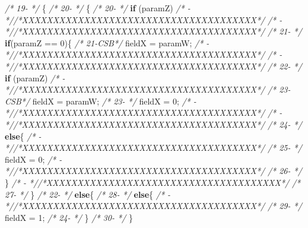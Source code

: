 \documentclass[
]{article}
\newenvironment{Shaded}{\begin{snugshade}}{\end{snugshade}}
\newcommand{\CommentTok}[1]{\textcolor[rgb]{0.56,0.35,0.01}{\textit{#1}}}
\newcommand{\DecValTok}[1]{\textcolor[rgb]{0.00,0.00,0.81}{#1}}
\newcommand{\KeywordTok}[1]{\textcolor[rgb]{0.13,0.29,0.53}{\textbf{#1}}}
\newcommand{\NormalTok}[1]{#1}
\begin{document}
\begin{landscape}
\begin{Shaded}
\begin{Highlighting}[]
\CommentTok{/* 19-   */}\NormalTok{    \{                                                    }\CommentTok{/* 20-   */}\NormalTok{    \{                                                    }
\CommentTok{/* 20-   */}        \KeywordTok{if}\NormalTok{ (paramZ)                                      }\CommentTok{/*   -   *//*XXXXXXXXXXXXXXXXXXXXXXXXXXXXXXXXXXXXXX*/}               
\CommentTok{/*   -   *//*XXXXXXXXXXXXXXXXXXXXXXXXXXXXXXXXXXXXXX*/}               \CommentTok{/* 21-   */}        \KeywordTok{if}\NormalTok{(paramZ == }\DecValTok{0}\NormalTok{)\{                                 }
\CommentTok{/* 21-CSB*/}\NormalTok{            fieldX = paramW;                             }\CommentTok{/*   -   *//*XXXXXXXXXXXXXXXXXXXXXXXXXXXXXXXXXXXXXX*/}               
\CommentTok{/*   -   *//*XXXXXXXXXXXXXXXXXXXXXXXXXXXXXXXXXXXXXX*/}               \CommentTok{/* 22-   */}            \KeywordTok{if}\NormalTok{ (paramZ)                                  }
\CommentTok{/*   -   *//*XXXXXXXXXXXXXXXXXXXXXXXXXXXXXXXXXXXXXX*/}               \CommentTok{/* 23-CSB*/}\NormalTok{                fieldX = paramW;                         }
\CommentTok{/* 23-   */}\NormalTok{            fieldX = }\DecValTok{0}\NormalTok{;                                  }\CommentTok{/*   -   *//*XXXXXXXXXXXXXXXXXXXXXXXXXXXXXXXXXXXXXX*/}               
\CommentTok{/*   -   *//*XXXXXXXXXXXXXXXXXXXXXXXXXXXXXXXXXXXXXX*/}               \CommentTok{/* 24-   */}            \KeywordTok{else}\NormalTok{\{                                        }
\CommentTok{/*   -   *//*XXXXXXXXXXXXXXXXXXXXXXXXXXXXXXXXXXXXXX*/}               \CommentTok{/* 25-   */}\NormalTok{                fieldX = }\DecValTok{0}\NormalTok{;                              }
\CommentTok{/*   -   *//*XXXXXXXXXXXXXXXXXXXXXXXXXXXXXXXXXXXXXX*/}               \CommentTok{/* 26-   */}\NormalTok{            \}                                            }
\CommentTok{/*   -   *//*XXXXXXXXXXXXXXXXXXXXXXXXXXXXXXXXXXXXXX*/}               \CommentTok{/* 27-   */}\NormalTok{        \}                                                }
\CommentTok{/* 22-   */}        \KeywordTok{else}\NormalTok{\{                                            }\CommentTok{/* 28-   */}        \KeywordTok{else}\NormalTok{\{                                            }
\CommentTok{/*   -   *//*XXXXXXXXXXXXXXXXXXXXXXXXXXXXXXXXXXXXXX*/}               \CommentTok{/* 29-   */}\NormalTok{            fieldX = }\DecValTok{1}\NormalTok{;                                  }
\CommentTok{/* 24-   */}\NormalTok{        \}                                                }\CommentTok{/* 30-   */}\NormalTok{        \}                                                }

\end{Highlighting}
\end{Shaded}
\end{landscape}
\end{document}
